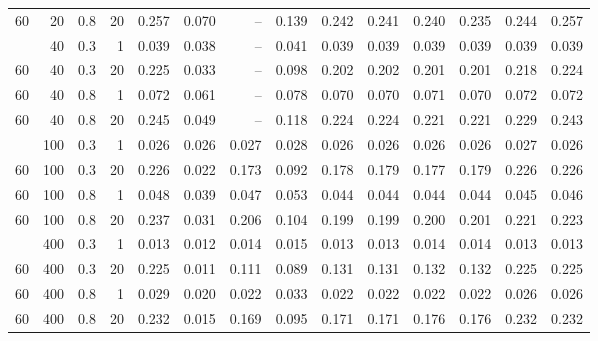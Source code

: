\begin{tabular}{@{}rrrrrrrrrrrrrr@{}}
60 & 20 & 0.8 & 20 & 0.257 & 0.070 & -- & 0.139 & 0.242 & 0.241 & 0.240 & 0.235 & 0.244 & 0.257 \\
\addlinespace[1pt]
60 & 40 & 0.3 & 1 & 0.039 & 0.038 & -- & 0.041 & 0.039 & 0.039 & 0.039 & 0.039 & 0.039 & 0.039 \\
60 & 40 & 0.3 & 20 & 0.225 & 0.033 & -- & 0.098 & 0.202 & 0.202 & 0.201 & 0.201 & 0.218 & 0.224 \\
60 & 40 & 0.8 & 1 & 0.072 & 0.061 & -- & 0.078 & 0.070 & 0.070 & 0.071 & 0.070 & 0.072 & 0.072 \\
60 & 40 & 0.8 & 20 & 0.245 & 0.049 & -- & 0.118 & 0.224 & 0.224 & 0.221 & 0.221 & 0.229 & 0.243 \\
\addlinespace[1pt]
60 & 100 & 0.3 & 1 & 0.026 & 0.026 & 0.027 & 0.028 & 0.026 & 0.026 & 0.026 & 0.026 & 0.027 & 0.026 \\
60 & 100 & 0.3 & 20 & 0.226 & 0.022 & 0.173 & 0.092 & 0.178 & 0.179 & 0.177 & 0.179 & 0.226 & 0.226 \\
60 & 100 & 0.8 & 1 & 0.048 & 0.039 & 0.047 & 0.053 & 0.044 & 0.044 & 0.044 & 0.044 & 0.045 & 0.046 \\
60 & 100 & 0.8 & 20 & 0.237 & 0.031 & 0.206 & 0.104 & 0.199 & 0.199 & 0.200 & 0.201 & 0.221 & 0.223 \\
\addlinespace[1pt]
60 & 400 & 0.3 & 1 & 0.013 & 0.012 & 0.014 & 0.015 & 0.013 & 0.013 & 0.014 & 0.014 & 0.013 & 0.013 \\
60 & 400 & 0.3 & 20 & 0.225 & 0.011 & 0.111 & 0.089 & 0.131 & 0.131 & 0.132 & 0.132 & 0.225 & 0.225 \\
60 & 400 & 0.8 & 1 & 0.029 & 0.020 & 0.022 & 0.033 & 0.022 & 0.022 & 0.022 & 0.022 & 0.026 & 0.026 \\
60 & 400 & 0.8 & 20 & 0.232 & 0.015 & 0.169 & 0.095 & 0.171 & 0.171 & 0.176 & 0.176 & 0.232 & 0.232 \\
\bottomrule
\end{tabular}